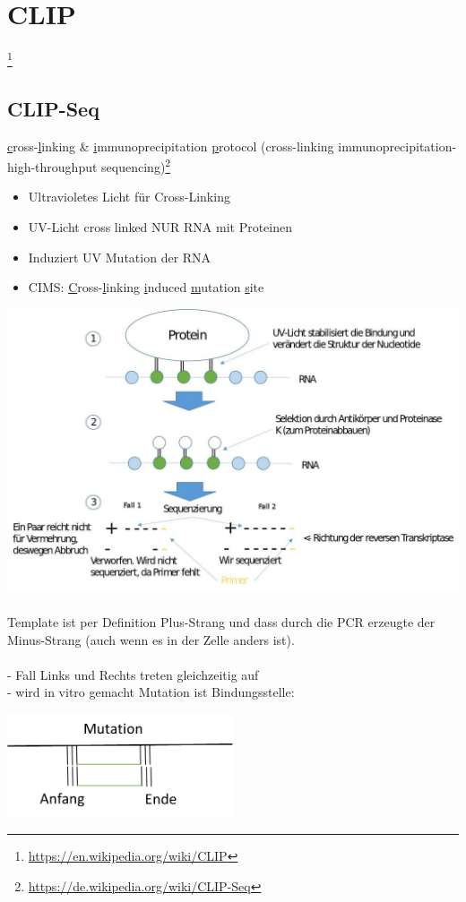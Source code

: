 \section{CLIP}\footnote{\url{https://en.wikipedia.org/wiki/CLIP}}

\subsection{CLIP-Seq}
\underline{c}ross-\underline{l}inking \& \underline{i}mmunoprecipitation \underline{p}rotocol (cross-linking immunoprecipitation-high-throughput sequencing)\footnote{\url{https://de.wikipedia.org/wiki/CLIP-Seq}}
\begin{itemize}
	\item Ultravioletes Licht für Cross-Linking
	\item UV-Licht cross linked NUR RNA mit Proteinen
	\item Induziert UV Mutation der RNA
	\item CIMS: \underline{C}ross-\underline{l}inking \underline{i}nduced \underline{m}utation \underline{s}ite
\end{itemize}

\includegraphics[width=1\textwidth]{lectures/160429/pix/clip_seq.jpg}
\\\\
Template ist per Definition Plus-Strang und dass durch die PCR erzeugte der Minus-Strang (auch wenn es in der Zelle anders ist).
\\\\
 - Fall Links und Rechts treten gleichzeitig auf\\
 - wird in vitro gemacht
\newpage
Mutation ist Bindungsstelle:
\begin{center}
\includegraphics[width=0.5\textwidth]{lectures/160429/pix/mutation.png}
\end{center}

